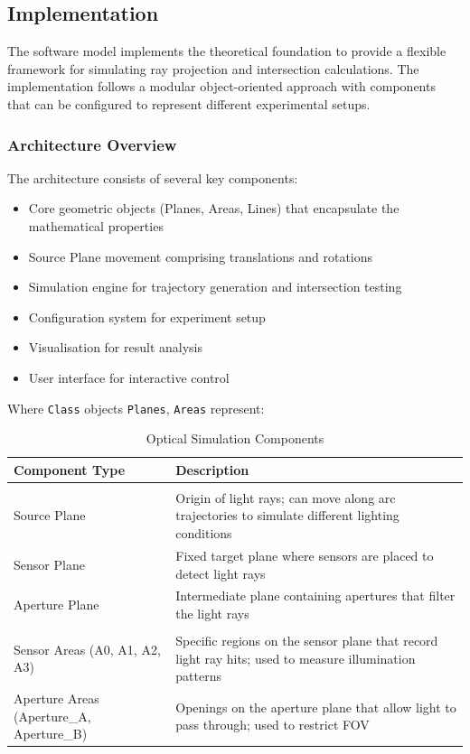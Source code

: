 \subsection{Implementation}

The software model implements the theoretical foundation to provide a flexible framework for simulating ray projection and intersection calculations. The implementation follows a modular object-oriented approach with  components that can be configured to represent different experimental setups.

\subsubsection{Architecture Overview}

The architecture consists of several key components:
\begin{itemize}
\item Core geometric objects (Planes, Areas, Lines) that encapsulate the mathematical properties
\item Source Plane movement comprising translations and rotations
\item Simulation engine for trajectory generation and intersection testing
\item Configuration system for experiment setup
\item Visualisation for result analysis
\item User interface for interactive control
\end{itemize}

Where \texttt{Class} objects \texttt{Planes}, \texttt{Areas} represent:
\begin{table}[h]
    \centering
    \caption{Optical Simulation Components}
    \label{tab:optical_components}
    \begin{tabular}{>{\raggedright\arraybackslash}p{3cm}>{\raggedright\arraybackslash}p{8cm}}
    \toprule
    \textbf{Component Type} & \textbf{Description} \\
    \midrule
    \multicolumn{2}{l}{\textbf{Planes}} \\
    \midrule
    Source Plane & Origin of light rays; can move along arc trajectories to simulate different lighting conditions \\
    Sensor Plane & Fixed target plane where sensors are placed to detect light rays \\
    Aperture Plane & Intermediate plane containing apertures that filter the light rays \\
    \midrule
    \multicolumn{2}{l}{\textbf{Areas}} \\
    \midrule
    Sensor Areas (A0, A1, A2, A3) & Specific regions on the sensor plane that record light ray hits; used to measure illumination patterns \\
    Aperture Areas (Aperture\_A, Aperture\_B) & Openings on the aperture plane that allow light to pass through; used to restrict  \ac{FOV} \\
    \bottomrule
    \end{tabular}
    \end{table}

